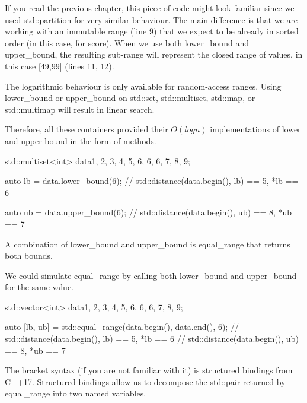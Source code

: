 If you read the previous chapter, this piece of code might look familiar since we used std::partition for very similar behaviour. The main difference is that we are working with an immutable range (line 9) that we expect to be already in sorted order (in this case, for score). When we use both lower\_bound and upper\_bound, the resulting sub-range will represent the closed range of values, in this case [49,99] (lines 11, 12).

The logarithmic behaviour is only available for random-access ranges. Using lower\_bound or upper\_bound on std::set, std::multiset, std::map, or std::multimap will result in linear search.

Therefore, all these containers provided their $O(logn)$ implementations of lower and upper bound in the form of methods.

\begin{box-note}
\begin{cppcode}
std::multiset<int> data{1, 2, 3, 4, 5, 6, 6, 6, 7, 8, 9};

auto lb = data.lower_bound(6);
// std::distance(data.begin(), lb) == 5, *lb == 6

auto ub = data.upper_bound(6);
// std::distance(data.begin(), ub) == 8, *ub == 7
\end{cppcode}
\end{box-note}

A combination of lower\_bound and upper\_bound is equal\_range that returns both bounds.



We could simulate equal\_range by calling both lower\_bound and upper\_bound for the same value.

\begin{box-note}
\begin{cppcode}
std::vector<int> data{1, 2, 3, 4, 5, 6, 6, 6, 7, 8, 9};

auto [lb, ub] = std::equal_range(data.begin(), data.end(), 6);
// std::distance(data.begin(), lb) == 5, *lb == 6
// std::distance(data.begin(), ub) == 8, *ub == 7
\end{cppcode}
\end{box-note}

The bracket syntax (if you are not familiar with it) is structured bindings from C++17. Structured bindings allow us to decompose the std::pair returned by equal\_range into two named variables.

